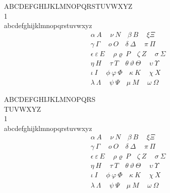 \documentclass[paper=a4, fontsize=30pt]{article}
\begin{document}
\LARGE
A\:\:B\:\:C\:\:D\:\:E\:\:F\:\:G\:\:H\:\:I\:\:J\:\:K\:\:L\:\:M\:\:N\:\:O\:\:P\:\:Q\:\:R\:\:S\:\:T\:\:U\:\:V\:\:W\:\:X\:\:Y\:\:Z\\
1\\
a\:b\:c\:d\:e\:f\:g\:h\:i\:j\:k\:l\:m\:n\:o\:p\:q\:r\:s\:t\:u\:v\:w\:x\:y\:z
\begin{align*}
\alpha\:A\quad\:\nu\:N
\quad\beta\:B\quad\:\xi\Xi\\
\gamma\:\Gamma\quad\:o\:O
\quad\delta\:\Delta\quad\:\pi\:\Pi\\
\epsilon\:\varepsilon\:E\quad\:\rho\varrho\:P\quad\zeta\:Z\quad\:\sigma\:\Sigma\\
\eta\:H\quad\:\tau\:T\quad\theta\:\vartheta\:\Theta\quad\:\upsilon\:\Upsilon\\
  \iota\:I\quad\:\phi\:\varphi\:\Phi\quad\kappa\:K\quad\:\chi\:X\\
\lambda\:\Lambda\quad\:\psi\:\Psi\quad\mu\:M\quad\:\omega\:\Omega
\end{align*}

\Huge
A\:\:B\:\:C\:\:D\:\:E\:\:F\:\:G\:\:H\:\:I\:\:J\:\:K\:\:L\:\:M\:\:N\:\:O\:\:P\:\:Q\:\:R\:\:S\\\:T\:\:U\:\:V\:\:W\:\:X\:\:Y\:\:Z\\
1\\
a\:b\:c\:d\:e\:f\:g\:h\:i\:j\:k\:l\:m\:n\:o\:p\:q\:r\:s\:t\:u\:v\:w\:x\:y\:z
\begin{align*}
\alpha\:A\quad\:\nu\:N
\quad\beta\:B\quad\:\xi\Xi\\
\gamma\:\Gamma\quad\:o\:O
\quad\delta\:\Delta\quad\:\pi\:\Pi\\
\epsilon\:\varepsilon\:E\quad\:\rho\varrho\:P\quad\zeta\:Z\quad\:\sigma\:\Sigma\\
\eta\:H\quad\:\tau\:T\quad\theta\:\vartheta\:\Theta\quad\:\upsilon\:\Upsilon\\
  \iota\:I\quad\:\phi\:\varphi\:\Phi\quad\kappa\:K\quad\:\chi\:X\\
\lambda\:\Lambda\quad\:\psi\:\Psi\quad\mu\:M\quad\:\omega\:\Omega
\end{align*}
\end{document}
